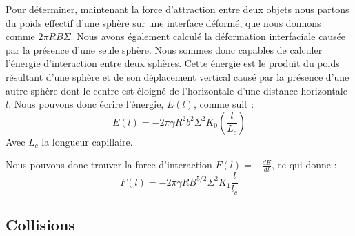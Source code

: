     Pour déterminer, maintenant la force d'attraction entre deux objets nous partons du poids effectif d'une sphère sur une interface déformé, que nous donnons comme \(2\pi RB\Sigma\). Nous avons également calculé la déformation interfaciale causée
    par la présence d'une seule sphère. Nous sommes donc capables de calculer l'énergie d'interaction entre deux sphères. Cette énergie est le produit du poids résultant d'une sphère et de son déplacement vertical causé par la présence d'une autre sphère dont le centre est éloigné de l'horizontale d'une distance horizontale $l$. Nous pouvons donc écrire l'énergie, $E(l)$, comme suit :
    \begin{equation}
        E(l)=-2\pi\gamma R^2b^2\Sigma^2K_0(\frac{l}{L_c})
        \label{eq:energyInteraction}
    \end{equation}
    Avec $L_c$ la longueur capillaire.

    Nous pouvons donc trouver la force d'interaction $F(l)=-\frac{dE}{dl}$, ce qui donne :
    \begin{equation}
        \boxed{F(l)=-2\pi\gamma RB^{5/2}\Sigma^2K_1\frac{l}{l_c}}
        \label{eq:ForceInteraction}
    \end{equation}



\subsection{Collisions}

